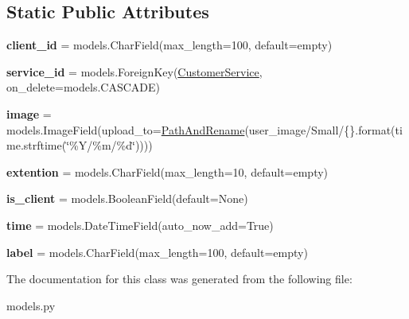 \subsection*{Static Public Attributes}
\begin{DoxyCompactItemize}
\item 
\mbox{\label{classbackend_1_1models_1_1_small_image_log_a2cac482f913dec988f5614fcaf8cff29}} 
{\bfseries client\+\_\+id} = models.\+Char\+Field(max\+\_\+length=100, default=\textquotesingle{}empty\textquotesingle{})
\item 
\mbox{\label{classbackend_1_1models_1_1_small_image_log_a4ee0d9d7b602c9a4fbc809c515f71e54}} 
{\bfseries service\+\_\+id} = models.\+Foreign\+Key(\textquotesingle{}\hyperlink{classbackend_1_1models_1_1_customer_service}{Customer\+Service}\textquotesingle{}, on\+\_\+delete=models.\+C\+A\+S\+C\+A\+DE)
\item 
\mbox{\label{classbackend_1_1models_1_1_small_image_log_a68fa2e6c5d170c774c85b8f183eff977}} 
{\bfseries image} = models.\+Image\+Field(upload\+\_\+to=\hyperlink{classbackend_1_1models__helper__functions_1_1_path_and_rename}{Path\+And\+Rename}(\textquotesingle{}user\+\_\+image/Small/\{\}\textquotesingle{}.format(time.\+strftime(\char`\"{}\%Y/\%m/\%d\char`\"{}))))
\item 
\mbox{\label{classbackend_1_1models_1_1_small_image_log_a5fbf065613b02341e408275708b3af8d}} 
{\bfseries extention} = models.\+Char\+Field(max\+\_\+length=10, default=\textquotesingle{}empty\textquotesingle{})
\item 
\mbox{\label{classbackend_1_1models_1_1_small_image_log_a377bbf97d5fc4e4797487c02a6e3906c}} 
{\bfseries is\+\_\+client} = models.\+Boolean\+Field(default=None)
\item 
\mbox{\label{classbackend_1_1models_1_1_small_image_log_a6e6e006fa871d0ae6716b24d60c54a42}} 
{\bfseries time} = models.\+Date\+Time\+Field(auto\+\_\+now\+\_\+add=True)
\item 
\mbox{\label{classbackend_1_1models_1_1_small_image_log_a2459433e63e3526c8cfeac1a9160a87b}} 
{\bfseries label} = models.\+Char\+Field(max\+\_\+length=100, default=\textquotesingle{}empty\textquotesingle{})
\end{DoxyCompactItemize}


The documentation for this class was generated from the following file\+:\begin{DoxyCompactItemize}
\item 
models.\+py\end{DoxyCompactItemize}
